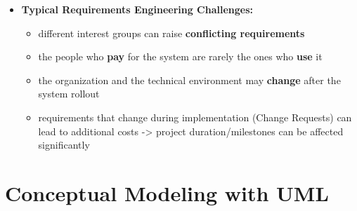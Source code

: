 \documentclass[ieeetran]{article}
\begin{document}
\begin{itemize}
\item \textbf{Typical Requirements Engineering Challenges:}
	\begin{itemize}
	  \item different interest groups can raise \textbf{conflicting requirements}
	\item the people who \textbf{pay} for the system are rarely the ones who \textbf{use} it
	\item the organization and the technical environment may \textbf{change} after the system rollout
	\item requirements that change during implementation (Change Requests) can lead to additional costs -> project duration/milestones can be affected significantly
	\end{itemize}
\end{itemize}


\section{Conceptual Modeling with UML} %
\label{sec:conceptual_modeling_with_uML}
\end{document}

